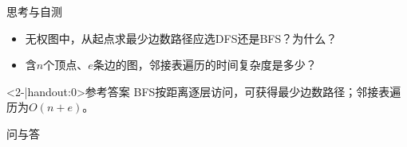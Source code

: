 \begin{frame}{思考与自测}
    \begin{itemize}
        \item 无权图中，从起点求最少边数路径应选DFS还是BFS？为什么？
        \item 含$n$个顶点、$e$条边的图，邻接表遍历的时间复杂度是多少？
    \end{itemize}
    \pause
    \begin{block}<2-|handout:0>{参考答案}
        BFS按距离逐层访问，可获得最少边数路径；邻接表遍历为$O(n+e)$。
    \end{block}
\end{frame}

\begin{standout}[]
    问与答
\end{standout}